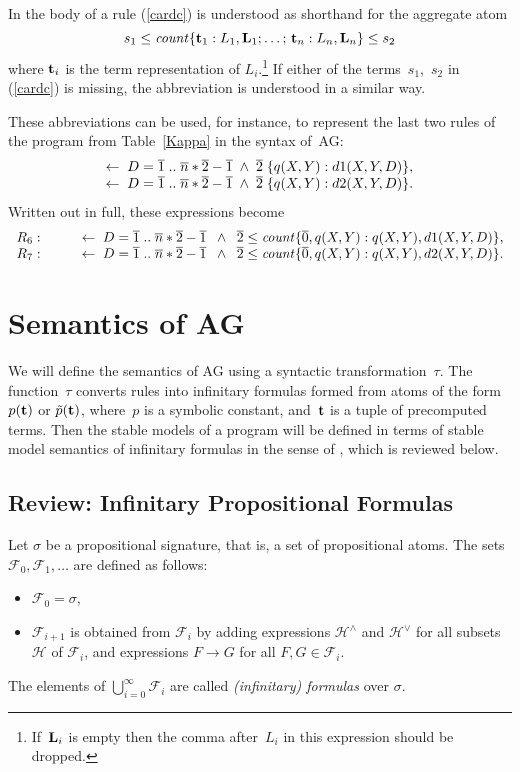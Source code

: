 \documentclass{tlp}
\def\ar{\leftarrow}
\def\rar{\rightarrow}
\def\ba{\begin{array}}
\def\ea{\end{array}}
\begin{document}
In the body of a rule (\ref{cardc}) is understood as shorthand for the 
aggregate atom $$s_1\leq{\it count}\{{\bf t}_1:L_1,{\bf L}_1;\ldots;\,
{\bf t}_n :L_n, {\bf L}_n\}\leq s_2$$
where ${\bf t}_i$ is the term representation of $L_i$.\footnote{If~${\bf L}_i$ 
is empty then the comma after~$L_i$ in this expression should be dropped.} If 
either of the terms~$s_1$,~$s_2$ in (\ref{cardc}) is missing, the
abbreviation is understood in a similar way.

These abbreviations can be used, for instance, to represent the last two
rules of the program from Table~\ref{Kappa} in the syntax of~AG:
$$\ba l
\ar \; D = \overline 1\;..\;\overline n*\overline 2-\overline 1 \; \land \;\overline 2 \; \{ q(X,Y)
: d1(X,Y,D) \},\\
\ar \; D = \overline 1\;..\;\overline n*\overline 2-\overline 1 \; \land \;\overline 2 \; \{ q(X,Y)
: d2(X,Y,D) \}.
\ea
$$
Written out in full, these expressions become
$$
\ba{ll}
R_6: \qquad  & \ar \; D = \overline 1\;..\;\overline n*\overline 2-\overline 1 
\;\; \land \;\; \overline 2 \leq {\it count}\{ \overline 0, q(X,Y)
:q(X,Y), d1(X,Y,D) \},\\
R_7: \qquad  & \ar \; D = \overline 1\;..\;\overline n*\overline 2-\overline 1 
\;\; \land \;\; \overline 2 \leq {\it count}\{ \overline 0,q(X,Y)
:q(X,Y), d2(X,Y,D) \}.
\ea
$$

\section{Semantics of AG} \label{sec:semantics}

We will define the semantics of AG using a syntactic 
transformation~$\tau$.  The function~$\tau$ converts rules 
into infinitary formulas formed from atoms 
of the form $p({\bf t})$ or $\tilde{p}({\bf t})$, where~$p$ is a symbolic 
constant, and~${\bf t}$ is a tuple 
of precomputed terms.  Then the stable models of a program 
will be defined in terms of stable model semantics of infinitary formulas 
in the sense of  \citeyear{tru12}, which is reviewed below.

\subsection{Review: Infinitary Propositional Formulas}\label{sem:inf}

Let $\sigma$ be a propositional signature,
that is, a set of propositional atoms.  The sets
\hbox{$\mathcal{F}_0,\mathcal{F}_1,\ldots$} are defined as follows:
\begin{itemize}
\item $\mathcal{F}_0=\sigma$,
\item $\mathcal{F}_{i+1}$ is obtained from $\mathcal{F}_{i}$ by
adding expressions $\mathcal{H}^\land$ and $\mathcal{H}^\lor$ for all subsets
$\mathcal{H}$ of $\mathcal{F}_i$, and expressions \hbox{$F\rar G$}
for all $F,G\in\mathcal{F}_i$.
\end{itemize}
The elements of $\bigcup^{\infty}_{i=0}\mathcal{F}_i$ are called {\sl
(infinitary) formulas} over $\sigma$.  
\end{document}
